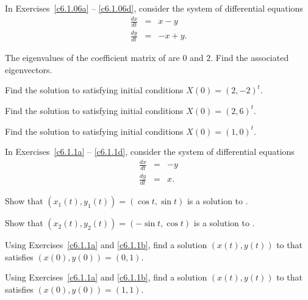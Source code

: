 \documentclass{ximera}
\begin{document}
\noindent In Exercises~\ref{c6.1.06a} -- \ref{c6.1.06d}, consider the system of
differential equations
\begin{equation} \label{Ex.1.06}
\begin{array}{rcr}
\frac{dx}{dt}  & = & x-y \\
\frac{dy}{dt}  & = & -x+y.
\end{array}
\end{equation}
\begin{exercise} \label{c6.1.06a}
The eigenvalues of the coefficient matrix of  are $0$ and $2$.
Find the associated eigenvectors.
\end{exercise}
\begin{exercise} \label{c6.1.06b}
Find the solution to  satisfying initial conditions
$X(0)=(2,-2)^t$.
\end{exercise}
\begin{exercise} \label{c6.1.06c}
Find the solution to  satisfying initial conditions
$X(0)=(2,6)^t$.
\end{exercise}
\begin{exercise} \label{c6.1.06d}
Find the solution to  satisfying initial conditions
$X(0)=(1,0)^t$.
\end{exercise}


\noindent In Exercises~\ref{c6.1.1a} -- \ref{c6.1.1d}, consider the system of
differential equations
\begin{equation} \label{E:c6.1.1}
\begin{array}{rcr}
\frac{dx}{dt}  & = & -y \\
\frac{dy}{dt}  & = &  x.
\end{array}
\end{equation}
\begin{exercise} \label{c6.1.1a}
Show that $(x_1(t),y_1(t)) = (\cos t,\sin t)$ is a solution to .
\end{exercise}
\begin{exercise} \label{c6.1.1b}
Show that $(x_2(t),y_2(t)) = (-\sin t,\cos t)$ is a solution to .
\end{exercise}
\begin{exercise} \label{c6.1.1c}
Using Exercises~\ref{c6.1.1a} and \ref{c6.1.1b}, find a solution $(x(t),y(t))$
to  that satisfies $(x(0),y(0)) = (0,1)$.
\end{exercise}
\begin{exercise} \label{c6.1.1d}
Using Exercises~\ref{c6.1.1a} and \ref{c6.1.1b}, find a solution $(x(t),y(t))$
to  that satisfies $(x(0),y(0)) = (1,1)$.
\end{exercise}
\end{document}
